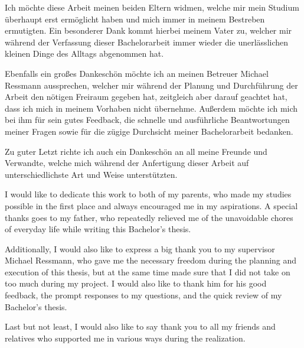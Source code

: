 \documentclass[draft,final]{vutinfth} %
\begin{document}
    \frontmatter %

    \addstatementpage

    \begin{danksagung*}

        Ich möchte diese Arbeit meinen beiden Eltern widmen, welche mir mein Studium überhaupt erst ermöglicht haben und mich immer in meinem Bestreben ermutigten.
        Ein besonderer Dank kommt hierbei meinem Vater zu, welcher mir während der Verfassung dieser Bachelorarbeit immer wieder die unerlässlichen kleinen Dinge des Alltags abgenommen hat.

        Ebenfalls ein großes Dankeschön möchte ich an meinen Betreuer Michael Ressmann aussprechen, welcher mir während der Planung und Durchführung der Arbeit den nötigen Freiraum gegeben hat, zeitgleich aber darauf geachtet hat, dass ich mich in meinem Vorhaben nicht übernehme.
        Außerdem möchte ich mich bei ihm für sein gutes Feedback, die schnelle und ausführliche Beantwortungen meiner Fragen sowie für die zügige Durchsicht meiner Bachelorarbeit bedanken.

        Zu guter Letzt richte ich auch ein Dankeschön an all meine Freunde und Verwandte, welche mich während der Anfertigung dieser Arbeit auf unterschiedlichste Art und Weise unterstützten.

    \end{danksagung*}

    \begin{acknowledgements*}
        I would like to dedicate this work to both of my parents, who made my studies possible in the first place and always encouraged me in my aspirations.
        A special thanks goes to my father, who repeatedly relieved me of the unavoidable chores of everyday life while writing this Bachelor's thesis.

        Additionally, I would also like to express a big thank you to my supervisor Michael Ressmann, who gave me the necessary freedom during the planning and execution of this thesis, but at the same time made sure that I did not take on too much during my project.
        I would also like to thank him for his good feedback, the prompt responses to my questions, and the quick review of my Bachelor's thesis.

        Last but not least, I would also like to say thank you to all my friends and relatives who supported me in various ways during the realization.

    \end{acknowledgements*}
\end{document}
